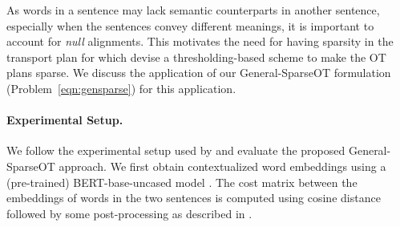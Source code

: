 \begin{figure}[t]
\end{figure}

As words in a sentence may lack semantic counterparts in another sentence, especially when the sentences convey different meanings, it is important to account for \textit{null} alignments. This motivates the need for having sparsity in the transport plan for which \citet{arase-etal-2023-unbalanced} devise a thresholding-based scheme to make the OT plans sparse. We discuss the application of our General-SparseOT formulation (Problem~\ref{eqn:gensparse}) for this application.

\paragraph{Experimental Setup.} 
We follow the experimental setup used by \cite{arase-etal-2023-unbalanced} and evaluate the proposed General-SparseOT approach.
 We first obtain contextualized word embeddings using a (pre-trained) BERT-base-uncased model \citep{devlin19}. The cost matrix between the embeddings of words in the two sentences is computed using cosine distance followed by some post-processing as described in \cite{arase-etal-2023-unbalanced}.

